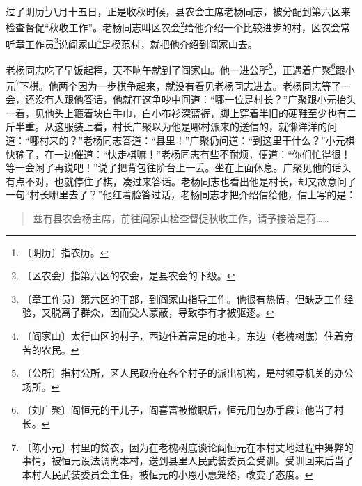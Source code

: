 \documentclass[12pt,UTF-8,openany]{ctexbook}
\begin{document}
\begin{large}
    
    过了阴历\footnote{〔阴历〕指农历。}八月十五日，正是收秋时候，县农会主席老杨同志，被分配到第六区来检查督促“秋收工作”。老杨同志叫区农会\footnote{〔区农会〕指第六区的农会，是县农会的下级。}给他介绍一个比较进步的村，区农会常听章工作员\footnote{〔章工作员〕第六区的干部，到阎家山指导工作。他很有热情，但缺乏工作经验，又脱离了群众，因而受人蒙蔽，导致李有才被驱逐。}说阎家山\footnote{〔阎家山〕太行山区的村子，西边住着富足的地主，东边（老槐树底）住着穷苦的农民。}是模范村，就把他介绍到阎家山去。
    
    老杨同志吃了早饭起程，天不晌午就到了阎家山。他一进公所\footnote{〔公所〕指村公所，区人民政府在各个村子的派出机构，是村领导机关的办公场所。}，正遇着广聚\footnote{〔刘广聚〕阎恒元的干儿子，阎喜富被撤职后，恒元用包办手段让他当了村长。}跟小元\footnote{〔陈小元〕村里的贫农，因为在老槐树底谈论阎恒元在本村丈地过程中舞弊的事情，被恒元设法调离本村，送到县里人民武装委员会受训。受训回来后当了本村人民武装委员会主任，被恒元的小恩小惠笼络，改变了态度。}下棋。他两个因为一步棋争起来，就没有看见老杨同志进去。老杨同志等了一会，还没有人跟他答话，他就在这争吵中间道：“哪一位是村长？”广聚跟小元抬头一看，见他头上箍着块白手巾，白小布衫深蓝裤，脚上穿着半旧的硬鞋至少也有二斤半重。从这服装上看，村长广聚以为他是哪村派来的送信的，就懒洋洋的问道：“哪村来的？”老杨同志答道：“县里！”广聚仍问道：“到这里干什么？”小元棋快输了，在一边催道：“快走棋嘛！”老杨同志有些不耐烦，便道：“你们忙得很！等一会闲了再说吧！”说了把背包往阶台上一丢。坐在上面休息。广聚见他的话头有点不对，也就停住了棋，凑过来答话。老杨同志也看出他是村长，却又故意问了一句“村长哪里去了？”他红着脸答过话，老杨同志才把介绍信给他，信上写的是：
    
    \begin{quotation}
    
    兹有县农会杨主席，前往阎家山检查督促秋收工作，请予接洽是荷……
    
    \end{quotation}
    

\end{large}
\end{document}
